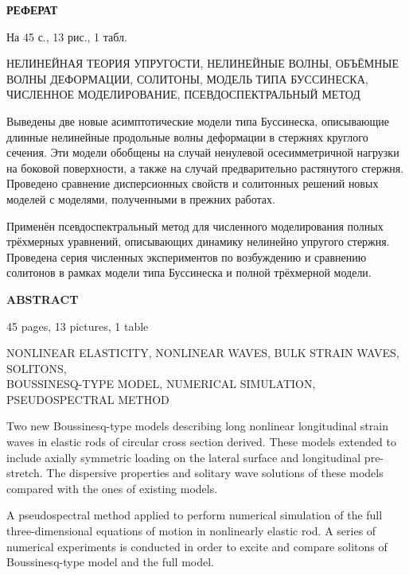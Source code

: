 \documentclass[12pt, a4paper]{report}
\begin{document}
\newpage
\thispagestyle{empty}
\begin{center}
	\textbf{РЕФЕРАТ}
\end{center}

На 45 с., 13 рис., 1 табл.

\vspace{3mm}
\hspace{-\parindent}НЕЛИНЕЙНАЯ ТЕОРИЯ УПРУГОСТИ, НЕЛИНЕЙНЫЕ ВОЛНЫ, ОБЪЁМНЫЕ ВОЛНЫ ДЕФОРМАЦИИ, СОЛИТОНЫ, МОДЕЛЬ ТИПА БУССИНЕСКА, ЧИСЛЕННОЕ МОДЕЛИРОВАНИЕ, ПСЕВДОСПЕКТРАЛЬНЫЙ МЕТОД
\vspace{3mm}

Выведены две новые асимптотические модели типа Буссинеска, описывающие длинные нелинейные продольные волны деформации в стержнях круглого сечения. Эти модели обобщены на случай ненулевой осесимметричной нагрузки на боковой поверхности, а также на случай предварительно растянутого стержня. Проведено сравнение дисперсионных свойств и солитонных решений новых моделей с моделями, полученными в прежних работах.

Применён псевдоспектральный метод для численного моделирования полных трёхмерных уравнений, описывающих динамику нелинейно упругого стержня. Проведена серия численных экспериментов по возбуждению и сравнению солитонов в рамках модели типа Буссинеска и полной трёхмерной модели.

\vspace{2cm}
\begin{center}
	\textbf{ABSTRACT}
\end{center}

45 pages, 13 pictures, 1 table

\vspace{3mm}
\hspace{-\parindent}NONLINEAR ELASTICITY, NONLINEAR WAVES, BULK STRAIN WAVES, SOLITONS, \\BOUSSINESQ-TYPE MODEL, NUMERICAL SIMULATION, PSEUDOSPECTRAL METHOD
\vspace{3mm}

Two new Boussinesq-type models describing long nonlinear longitudinal strain waves in elastic rods of circular cross section derived. These models extended to include axially symmetric loading on the lateral surface and longitudinal pre-stretch. The dispersive properties and solitary wave solutions of these models compared with the ones of existing models.

A pseudospectral method applied to perform numerical simulation of the full three-dimensional equations of motion in nonlinearly elastic rod. A series of numerical experiments is conducted in order to excite and compare solitons of Boussinesq-type model and the full model.
\end{document}
